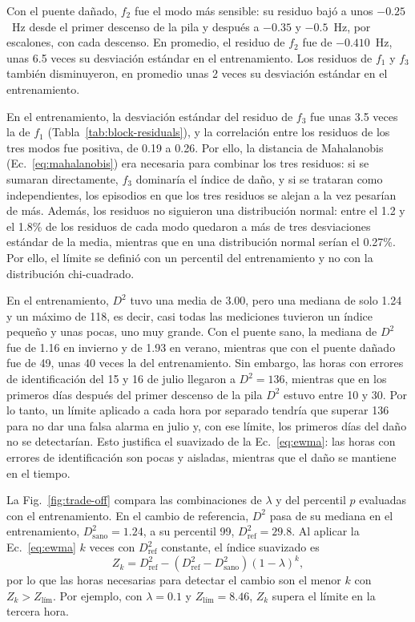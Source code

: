 \documentclass[9pt,twocolumn,twoside]{opticajnl}
\begin{document}
Con el puente dañado, $f_2$ fue el modo más sensible: su residuo bajó a unos $-0.25$~Hz desde el primer descenso de la pila y después a $-0.35$ y $-0.5$~Hz, por escalones, con cada descenso. En promedio, el residuo de $f_2$ fue de $-0.410$~Hz, unas 6.5 veces su desviación estándar en el entrenamiento. Los residuos de $f_1$ y $f_3$ también disminuyeron, en promedio unas 2 veces su desviación estándar en el entrenamiento.

En el entrenamiento, la desviación estándar del residuo de $f_3$ fue unas 3.5 veces la de $f_1$ (Tabla~\ref{tab:block-residuals}), y la correlación entre los residuos de los tres modos fue positiva, de 0.19 a 0.26. Por ello, la distancia de Mahalanobis (Ec.~\eqref{eq:mahalanobis}) era necesaria para combinar los tres residuos: si se sumaran directamente, $f_3$ dominaría el índice de daño, y si se trataran como independientes, los episodios en que los tres residuos se alejan a la vez pesarían de más. Además, los residuos no siguieron una distribución normal: entre el 1.2 y el 1.8\% de los residuos de cada modo quedaron a más de tres desviaciones estándar de la media, mientras que en una distribución normal serían el 0.27\%. Por ello, el límite se definió con un percentil del entrenamiento y no con la distribución chi-cuadrado.

En el entrenamiento, $D^2$ tuvo una media de 3.00, pero una mediana de solo 1.24 y un máximo de 118, es decir, casi todas las mediciones tuvieron un índice pequeño y unas pocas, uno muy grande. Con el puente sano, la mediana de $D^2$ fue de 1.16 en invierno y de 1.93 en verano, mientras que con el puente dañado fue de 49, unas 40 veces la del entrenamiento. Sin embargo, las horas con errores de identificación del 15 y 16 de julio llegaron a $D^2 = 136$, mientras que en los primeros días después del primer descenso de la pila $D^2$ estuvo entre 10 y 30. Por lo tanto, un límite aplicado a cada hora por separado tendría que superar 136 para no dar una falsa alarma en julio y, con ese límite, los primeros días del daño no se detectarían. Esto justifica el suavizado de la Ec.~\eqref{eq:ewma}: las horas con errores de identificación son pocas y aisladas, mientras que el daño se mantiene en el tiempo.

La Fig.~\ref{fig:trade-off} compara las combinaciones de $\lambda$ y del percentil $p$ evaluadas con el entrenamiento. En el cambio de referencia, $D^2$ pasa de su mediana en el entrenamiento, $D^2_\text{sano} = 1.24$, a su percentil 99, $D^2_\text{ref} = 29.8$. Al aplicar la Ec.~\eqref{eq:ewma} $k$ veces con $D^2_\text{ref}$ constante, el índice suavizado es
\begin{equation}
Z_k = D^2_\text{ref} - \left(D^2_\text{ref} - D^2_\text{sano}\right)(1-\lambda)^k,
\label{eq:reference-change}
\end{equation}
por lo que las horas necesarias para detectar el cambio son el menor $k$ con $Z_k > Z_\text{lím}$. Por ejemplo, con $\lambda = 0.1$ y $Z_\text{lím} = 8.46$, $Z_k$ supera el límite en la tercera hora.
\end{document}
